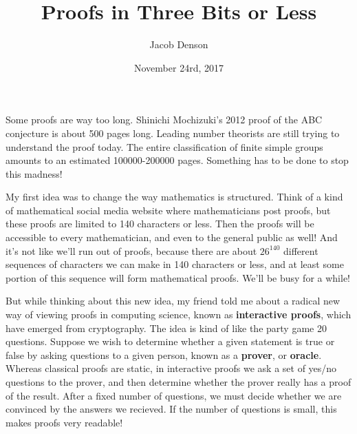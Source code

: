 \documentclass{article}
\title{Proofs in Three Bits or Less}
\author{Jacob Denson}
\date{November 24rd, 2017}
\theoremstyle{plain}
\theoremstyle{definition}
\begin{document}
\maketitle

Some proofs are way too long. Shinichi Mochizuki's 2012 proof of the ABC conjecture is about 500 pages long. Leading number theorists are still trying to understand the proof today. The entire classification of finite simple groups amounts to an estimated 100000-200000 pages. Something has to be done to stop this madness!

My first idea was to change the way mathematics is structured. Think of a kind of mathematical social media website where mathematicians post proofs, but these proofs are limited to 140 characters or less. Then the proofs will be accessible to every mathematician, and even to the general public as well! And it's not like we'll run out of proofs, because there are about $26^{140}$ different sequences of characters we can make in 140 characters or less, and at least some portion of this sequence will form mathematical proofs. We'll be busy for a while!

But while thinking about this new idea, my friend told me about a radical new way of viewing proofs in computing science, known as {\bf interactive proofs}, which have emerged from cryptography. The idea is kind of like the party game 20 questions. Suppose we wish to determine whether a given statement is true or false by asking questions to a given person, known as a {\bf prover}, or {\bf oracle}. Whereas classical proofs are static, in interactive proofs we ask a set of yes/no questions to the prover, and then determine whether the prover really has a proof of the result. After a fixed number of questions, we must decide whether we are convinced by the answers we recieved. If the number of questions is small, this makes proofs very readable!
\end{document}
